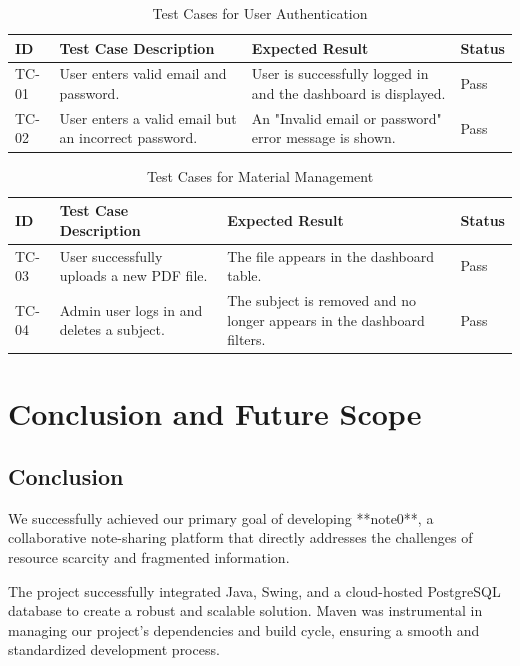 \documentclass[12pt, a4paper]{report}
\begin{document}
\begin{itemize}
\begin{table}[h!]
    \centering
    \caption{Test Cases for User Authentication}
    \label{tab:auth_tests}
    \begin{tabular}{|p{1cm}|p{4.5cm}|p{4.5cm}|p{2cm}|}
        \hline
        \textbf{ID} & \textbf{Test Case Description} & \textbf{Expected Result} & \textbf{Status} \\
        \hline
        TC-01 & User enters valid email and password. & User is successfully logged in and the dashboard is displayed. & Pass \\
        \hline
        TC-02 & User enters a valid email but an incorrect password. & An "Invalid email or password" error message is shown. & Pass \\
        \hline
    \end{tabular}
\end{table}

\begin{table}[h!]
    \centering
    \caption{Test Cases for Material Management}
    \label{tab:material_tests}
    \begin{tabular}{|p{1cm}|p{4.5cm}|p{4.5cm}|p{2cm}|}
        \hline
        \textbf{ID} & \textbf{Test Case Description} & \textbf{Expected Result} & \textbf{Status} \\
        \hline
        TC-03 & User successfully uploads a new PDF file. & The file appears in the dashboard table. & Pass \\
        \hline
        TC-04 & Admin user logs in and deletes a subject. & The subject is removed and no longer appears in the dashboard filters. & Pass \\
        \hline
    \end{tabular}
\end{table}
\chapter{Conclusion and Future Scope}

\section{Conclusion}
We successfully achieved our primary goal of developing **note0**, a collaborative note-sharing platform that directly addresses the challenges of resource scarcity and fragmented information.

The project successfully integrated Java, Swing, and a cloud-hosted PostgreSQL database to create a robust and scalable solution. Maven was instrumental in managing our project's dependencies and build cycle, ensuring a smooth and standardized development process.


\end{itemize}
\end{document}
